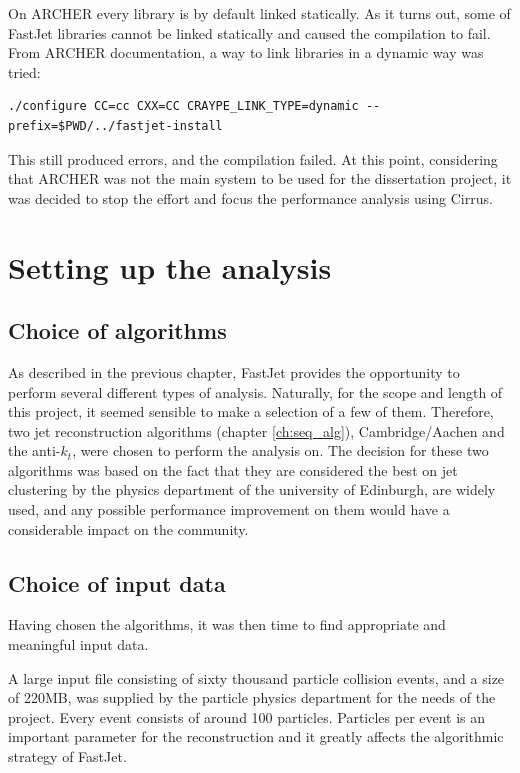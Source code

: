 On ARCHER every library is by default linked statically. As it turns out, some of FastJet libraries cannot be linked statically and caused the compilation to fail. From ARCHER documentation, a way to link libraries in a dynamic way was tried: 

\begin{lstlisting}
./configure CC=cc CXX=CC CRAYPE_LINK_TYPE=dynamic --prefix=$PWD/../fastjet-install
\end{lstlisting}

This still produced errors, and the compilation failed. At this point, considering that ARCHER was not the main system to be used for the dissertation project, it was decided to stop the effort and focus the performance analysis using Cirrus.

\section{Setting up the analysis}
\subsection{Choice of algorithms}
As described in the previous chapter, FastJet provides the opportunity to perform several different types of analysis. Naturally, for the scope and length of this project, it seemed sensible to make a selection of a few of them. Therefore, two jet reconstruction algorithms (chapter \ref{ch:seq_alg}), Cambridge/Aachen and the anti-$k_t$, were chosen to perform the analysis on. The decision for these two algorithms was based on the fact that they are considered the best on jet clustering by the physics department of the university of Edinburgh, are widely used, and any possible performance improvement on them would have a considerable impact on the community. 


\subsection{Choice of input data}
Having chosen the algorithms, it was then time to find appropriate and meaningful input data. 

A large input file consisting of sixty thousand particle collision events, and a size of 220MB, was supplied by the particle physics department for the needs of the project. Every event consists of around 100 particles. Particles per event is an important parameter for the reconstruction and it greatly affects the algorithmic strategy of FastJet.

